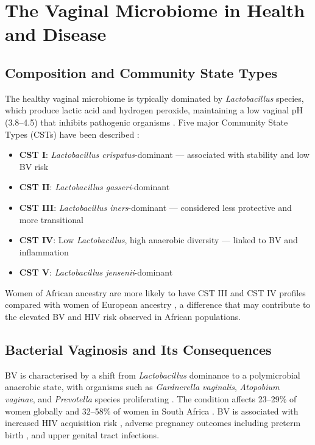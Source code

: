 \documentclass[12pt,a4paper]{report}
\begin{document}
\section{The Vaginal Microbiome in Health and Disease}

\subsection{Composition and Community State Types}

The healthy vaginal microbiome is typically dominated by \textit{Lactobacillus} species, which produce lactic acid and hydrogen peroxide, maintaining a low vaginal pH (3.8--4.5) that inhibits pathogenic organisms \cite{ravel2011, smith2012}. Five major Community State Types (CSTs) have been described \cite{ravel2011}:

\begin{itemize}
    \item \textbf{CST I}: \textit{Lactobacillus crispatus}-dominant --- associated with stability and low BV risk
    \item \textbf{CST II}: \textit{Lactobacillus gasseri}-dominant
    \item \textbf{CST III}: \textit{Lactobacillus iners}-dominant --- considered less protective and more transitional \cite{zheng2021}
    \item \textbf{CST IV}: Low \textit{Lactobacillus}, high anaerobic diversity --- linked to BV and inflammation
    \item \textbf{CST V}: \textit{Lactobacillus jensenii}-dominant
\end{itemize}

Women of African ancestry are more likely to have CST III and CST IV profiles compared with women of European ancestry \cite{roachford2022, gosmann2017lactobacillus}, a difference that may contribute to the elevated BV and HIV risk observed in African populations.

\subsection{Bacterial Vaginosis and Its Consequences}

BV is characterised by a shift from \textit{Lactobacillus} dominance to a polymicrobial anaerobic state, with organisms such as \textit{Gardnerella vaginalis}, \textit{Atopobium vaginae}, and \textit{Prevotella} species proliferating \cite{muzny2016pathogenesis}. The condition affects 23--29\% of women globally \cite{who2024} and 32--58\% of women in South Africa \cite{nicd2025, mbulawa2025}. BV is associated with increased HIV acquisition risk \cite{atashili2008}, adverse pregnancy outcomes including preterm birth \cite{hillier1995, goldenberg2000}, and upper genital tract infections.
\end{document}
